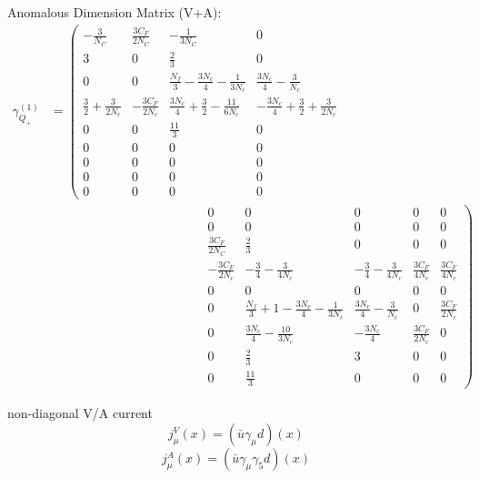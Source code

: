 \documentclass{article}
\begin{document}
  Anomalous Dimension Matrix (V+A):
  \begin{equation}
    \begin{split}
      \label{eq:anomalousDimensionMatrixVpA}
      \gamma^{(1)}_{Q_+} &= 
      \left(\begin{matrix}
          -\frac{3}{N_C} & \frac{3C_F}{2N_C} &-\frac{1}{3N_C} & 0   
          \\
          3 & 0 & \frac{2}{3} & 0    \\
          0 & 0 & \frac{N_f}{3}-\frac{3N_c}{4}-\frac{1}{3N_c} & \frac{3N_c}{4}-\frac{3}{N_c}   \\
          \frac{3}{2}+\frac{3}{2N_c} & -\frac{3C_F}{2N_c} & \frac{3N_c}{4}+\frac{3}{2}-\frac{11}{6N_c} & -\frac{3N_c}{4}+\frac{3}{2}+\frac{3}{2N_c} \\
          0 & 0 & \frac{11}{3} & 0 \\
          0 & 0 & 0 & 0 \\
          0 & 0 & 0 & 0 \\
          0 & 0 & 0 & 0 \\
          0 & 0 & 0 & 0 
        \end{matrix} \right. \\
      &\qquad\qquad\qquad\qquad\qquad\qquad \left.\begin{matrix}
          0 & 0 & 0 & 0 & 0 \\
          0 & 0 & 0 & 0 & 0 \\
          \frac{3C_F}{2N_C} & \frac{2}{3} & 0 & 0 & 0 \\
          -\frac{3C_F}{2N_c} & -\frac{3}{4}-\frac{3}{4N_c} & -\frac{3}{4}-\frac{3}{4N_c} & \frac{3C_F}{4N_c} & \frac{3C_F}{4N_c} \\
          0 & 0 & 0 & 0 & 0 \\
          0 & \frac{N_f}{3}+1-\frac{3N_c}{4}-\frac{1}{3N_c} & \frac{3N_c}{4}-\frac{3}{N_c} & 0  & \frac{3C_F}{2N_c} \\
          0 & \frac{3N_c}{4}-\frac{10}{3N_c} & -\frac{3N_c}{4} & \frac{3C_F}{2N_c} & 0 \\
          0 & \frac{2}{3} & 3 & 0 & 0 \\
          0 & \frac{11}{3} & 0 & 0 & 0 
        \end{matrix}\right)
    \end{split}
  \end{equation}

  non-diagonal V/A current
  \begin{equation}
    j_\mu^V(x) = (\bar u \gamma_\mu d)(x)
  \end{equation}
  \begin{equation}
    j_\mu^A(x) = (\bar u \gamma_\mu \gamma_5 d)(x)
  \end{equation}
\end{document}
